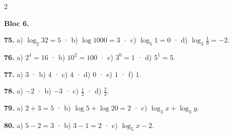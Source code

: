 \documentclass[13pt,a4paper]{extarticle}
\begin{document}
\begin{multicols}{2}
\begin{minipage}{\linewidth}
\textbf{Bloc 6.}\par
\end{minipage}\par\vspace{1.6mm}
\par\noindent\begin{minipage}{\linewidth}
\textbf{75.} a) $\log_2 32=5$ · b) $\log 1000=3$ · c) $\log_5 1=0$ · d) $\log_3\tfrac19=-2$.\par
\end{minipage}\par\vspace{1.6mm}
\par\noindent\begin{minipage}{\linewidth}
\textbf{76.} a) $2^4=16$ · b) $10^2=100$ · c) $3^0=1$ · d) $5^1=5$.\par
\end{minipage}\par\vspace{1.6mm}
\par\noindent\begin{minipage}{\linewidth}
\textbf{77.} a) $3$ · b) $4$ · c) $4$ · d) $0$ · e) $1$ · f) $1$.\par
\end{minipage}\par\vspace{1.6mm}
\par\noindent\begin{minipage}{\linewidth}
\textbf{78.} a) $-2$ · b) $-3$ · c) $\tfrac12$ · d) $\tfrac23$.\par
\end{minipage}\par\vspace{1.6mm}
\par\noindent\begin{minipage}{\linewidth}
\textbf{79.} a) $2+3=5$ · b) $\log5+\log20=2$ · c) $\log_3x+\log_3y$.\par
\end{minipage}\par\vspace{1.6mm}
\par\noindent\begin{minipage}{\linewidth}
\textbf{80.} a) $5-2=3$ · b) $3-1=2$ · c) $\log_5x-2$.\par
\end{minipage}\par\vspace{1.6mm}
\par\noindent\begin{minipage}{\linewidth}

\end{minipage}
\end{multicols}
\end{document}

